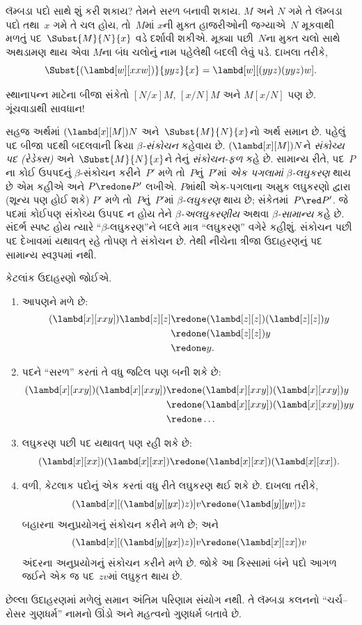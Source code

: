 \documentclass[../../../include/open-logic-section]{subfiles}
\begin{document}

લૅમ્બડા પદો સાથે શું કરી શકાય? તેમને સરળ બનાવી શકાય.
$M$ અને $N$ ગમે તે લૅમ્બડા પદો તથા~$x$ ગમે તે ચલ હોય, તો~$M$માં
$x$ની મુક્ત હાજરીઓની જગ્યાએ~$N$ મૂકવાથી મળતું પદ~$\Subst{M}{N}{x}$ વડે
દર્શાવી શકીએ. મૂક્યા પછી~$N$ના મુક્ત ચલો સાથે અથડામણ થાય એવા
$M$ના બંધ ચલોનું નામ પહેલેથી બદલી લેવું પડે. દાખલા તરીકે,
\[
\Subst{(\lambd[w][xxw])}{yyz}{x} = \lambd[w][(yyz)(yyz)w].
\]

\begin{digress}
સ્થાનાપન્ન માટેના બીજા સંકેતો $[N/x]M$, $[x/N]M$ અને
$M[x/N]$ પણ છે. ગૂંચવાડાથી સાવધાન!
\end{digress}

સહજ અર્થમાં $(\lambd[x][M])N$ અને~$\Subst{M}{N}{x}$નો અર્થ
સમાન છે. પહેલું પદ બીજા પદથી બદલવાની ક્રિયા
\emph{$\beta$-સંકોચન} કહેવાય છે. $(\lambd[x][M])N$ને
\emph{સંકોચ્ય પદ (રેડેક્સ)} અને~$\Subst{M}{N}{x}$ને તેનું
\emph{સંકોચન-ફળ} કહે છે. સામાન્ય રીતે, પદ~$P$ના કોઈ ઉપપદનું
$\beta$-સંકોચન કરીને~$P'$ મળે તો~$P$નું~$P'$માં
\emph{એક પગલામાં $\beta$-લઘુકરણ} થાય છે એમ કહીએ અને
$P \redone P'$ લખીએ. $P$માંથી એક-પગલાના અમુક લઘુકરણો દ્વારા
(શૂન્ય પણ હોઈ શકે) $P'$ મળે તો~$P$નું~$P'$માં
\emph{$\beta$-લઘુકરણ} થાય છે; સંકેતમાં~$P \red P'$.
જે પદમાં કોઈપણ સંકોચ્ય ઉપપદ ન હોય તેને
\emph{$\beta$-અલઘુકરણીય} અથવા \emph{$\beta$-સામાન્ય}
કહે છે. સંદર્ભ સ્પષ્ટ હોય ત્યારે ``$\beta$-લઘુકરણ''ને બદલે
માત્ર ``લઘુકરણ'' વગેરે કહીશું.
સંકોચન પછી પદ દેખાવમાં યથાવત્ રહે તોપણ તે સંકોચન છે.
તેથી નીચેના ત્રીજા ઉદાહરણનું પદ સામાન્ય સ્વરૂપમાં નથી.

કેટલાંક ઉદાહરણો જોઈએ.
\begin{enumerate}
\item આપણને મળે છે:
\begin{align*}
(\lambd[x][xxy]) \lambd[z][z] & \redone (\lambd[z][z])(\lambd[z][z]) y \\
& \redone (\lambd[z][z]) y \\
& \redone y.
\end{align*}
\item પદને ``સરળ'' કરતાં તે વધુ જટિલ પણ બની શકે છે:
\begin{align*}
(\lambd[x][xxy])(\lambd[x][xxy]) & \redone (\lambd[x][xxy])(\lambd[x][xxy])y \\
& \redone (\lambd[x][xxy])(\lambd[x][xxy])yy \\
& \redone \dots
\end{align*}
\item લઘુકરણ પછી પદ યથાવત્ પણ રહી શકે છે:
\[
(\lambd[x][xx])(\lambd[x][xx]) \redone (\lambd[x][xx])(\lambd[x][xx]).
\]
\item વળી, કેટલાક પદોનું એક કરતાં વધુ રીતે લઘુકરણ થઈ શકે છે.
  દાખલા તરીકે,
\[
(\lambd[x][(\lambd[y][yx]) z)] v \redone (\lambd[y][yv]) z
\]
બહારના અનુપ્રયોગનું સંકોચન કરીને મળે છે; અને
\[
(\lambd[x][(\lambd[y][yx]) z)] v \redone (\lambd[x][zx]) v
\]
અંદરના અનુપ્રયોગનું સંકોચન કરીને મળે છે. જોકે આ કિસ્સામાં
બંને પદો આગળ જઈને એક જ પદ~$zv$માં લઘુકૃત થાય છે.
\end{enumerate}

છેલ્લા ઉદાહરણમાં મળેલું સમાન અંતિમ પરિણામ સંયોગ નથી. તે
લૅમ્બડા કલનનો ``ચર્ચ--રોસર ગુણધર્મ'' નામનો ઊંડો અને મહત્વનો
ગુણધર્મ બતાવે છે.
\end{document}

